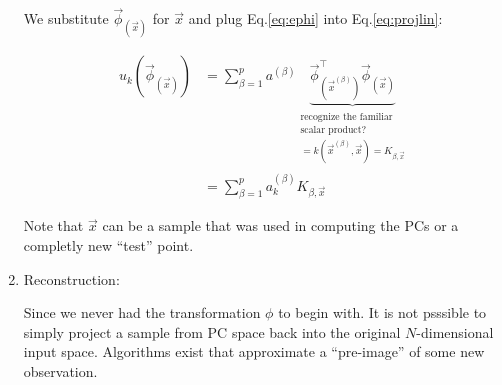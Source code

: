 \begin{enumerate}
We substitute $\vec \phi_{(\vec x)}$ for $\vec x$ and plug Eq.\ref{eq:ephi} into Eq.\ref{eq:projlin}:

\begin{align}
\label{eq:projk1}
u_k(\vec \phi_{(\vec x)}) &= \sum^{p}_{\beta=1} a^{(\beta)} 
\underbrace{
\vec{\phi}^\top_{(\vec{x}^{(\beta)})} \vec \phi_{(\vec x)}
}_{\substack{
\text{recognize the familiar}\\
\text{scalar product?}
\\ =k(\vec x^{(\beta)}, \vec x) = K_{\beta,\vec x}}}\\
&= \sum_{\beta=1}^{p} a_k^{(\beta)} K_{\beta, \vec x}
\end{align}

Note that $\vec x$ can be a sample that was used in computing the PCs or a completly new ``test'' point.

\item Reconstruction:

Since we never had the transformation $\phi$ to begin with. 
It is not psssible to simply project a sample from PC space back into the original $N$-dimensional input space. 
Algorithms exist that approximate a ``pre-image'' of some new observation.
\end{enumerate}
